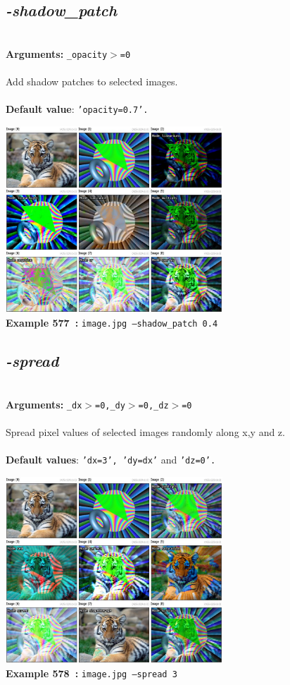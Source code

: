 \documentclass[a4paper,11pt,twoside]{book}
\begin{document}
\subsection{\emph{-shadow\_patch} }\vspace*{-0.5em}
~\\\textbf{Arguments: } 
{\small \texttt{\_opacity$>$=0}}\\~\\
Add shadow patches to selected images.
~\\~\\\textbf{Default value}: {\small \texttt{'opacity=0.7'.}}
\begin{center}\includegraphics[keepaspectratio=true,height=7cm,width=\textwidth]{img/gmic_def577.jpg}\\
{\footnotesize \textbf{Example 577~:} \texttt{image.jpg --shadow\_patch 0.4}}
\end{center}

\subsection{\emph{-spread} }\vspace*{-0.5em}
~\\\textbf{Arguments: } 
{\small \texttt{\_dx$>$=0,\_dy$>$=0,\_dz$>$=0}}\\~\\
Spread pixel values of selected images randomly along x,y and z.
~\\~\\\textbf{Default values}: {\small \texttt{'dx=3', 'dy=dx'} and \texttt{'dz=0'.}}
\begin{center}\includegraphics[keepaspectratio=true,height=7cm,width=\textwidth]{img/gmic_def578.jpg}\\
{\footnotesize \textbf{Example 578~:} \texttt{image.jpg --spread 3}}
\end{center}
\end{document}
